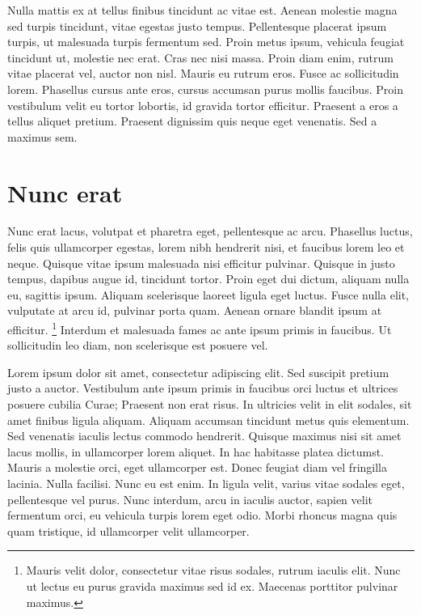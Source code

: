 Nulla mattis ex at tellus finibus tincidunt ac vitae est. Aenean molestie magna sed turpis tincidunt, vitae egestas justo tempus. Pellentesque placerat ipsum turpis, ut malesuada turpis fermentum sed. Proin metus ipsum, vehicula feugiat tincidunt ut, molestie nec erat. Cras nec nisi massa. Proin diam enim, rutrum vitae placerat vel, auctor non nisl. Mauris eu rutrum eros. Fusce ac sollicitudin lorem. Phasellus cursus ante eros, cursus accumsan purus mollis faucibus. Proin vestibulum velit eu tortor lobortis, id gravida tortor efficitur. Praesent a eros a tellus aliquet pretium. Praesent dignissim quis neque eget venenatis. Sed a maximus sem.

\section{Nunc erat}

Nunc erat lacus, volutpat et pharetra eget, pellentesque ac arcu. Phasellus luctus, felis quis ullamcorper egestas, lorem nibh hendrerit nisi, et faucibus lorem leo et neque. Quisque vitae ipsum malesuada nisi efficitur pulvinar. Quisque in justo tempus, dapibus augue id, tincidunt tortor. Proin eget dui dictum, aliquam nulla eu, sagittis ipsum. Aliquam scelerisque laoreet ligula eget luctus. Fusce nulla elit, vulputate at arcu id, pulvinar porta quam. Aenean ornare blandit ipsum at efficitur. \footnote{Mauris velit dolor, consectetur vitae risus sodales, rutrum iaculis elit. Nunc ut lectus eu purus gravida maximus sed id ex. Maecenas porttitor pulvinar maximus.} Interdum et malesuada fames ac ante ipsum primis in faucibus. Ut sollicitudin leo diam, non scelerisque est posuere vel.

Lorem ipsum dolor sit amet, consectetur adipiscing elit. Sed suscipit pretium justo a auctor. Vestibulum ante ipsum primis in faucibus orci luctus et ultrices posuere cubilia Curae; Praesent non erat risus. In ultricies velit in elit sodales, sit amet finibus ligula aliquam. Aliquam accumsan tincidunt metus quis elementum. Sed venenatis iaculis lectus commodo hendrerit. Quisque maximus nisi sit amet lacus mollis, in ullamcorper lorem aliquet. In hac habitasse platea dictumst. Mauris a molestie orci, eget ullamcorper est. Donec feugiat diam vel fringilla lacinia. Nulla facilisi. Nunc eu est enim. In ligula velit, varius vitae sodales eget, pellentesque vel purus. Nunc interdum, arcu in iaculis auctor, sapien velit fermentum orci, eu vehicula turpis lorem eget odio. Morbi rhoncus magna quis quam tristique, id ullamcorper velit ullamcorper.

